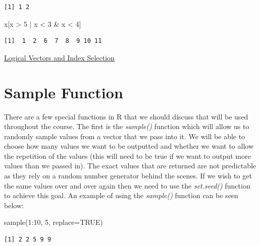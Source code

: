 \documentclass[
  letterpaper,
  DIV=11,
  numbers=noendperiod]{scrreprt}
\newenvironment{Shaded}{\begin{snugshade}}{\end{snugshade}}
\newcommand{\AttributeTok}[1]{\textcolor[rgb]{0.40,0.45,0.13}{#1}}
\newcommand{\ConstantTok}[1]{\textcolor[rgb]{0.56,0.35,0.01}{#1}}
\newcommand{\DecValTok}[1]{\textcolor[rgb]{0.68,0.00,0.00}{#1}}
\newcommand{\FunctionTok}[1]{\textcolor[rgb]{0.28,0.35,0.67}{#1}}
\newcommand{\NormalTok}[1]{\textcolor[rgb]{0.00,0.23,0.31}{#1}}
\newcommand{\SpecialCharTok}[1]{\textcolor[rgb]{0.37,0.37,0.37}{#1}}
\begin{document}
\begin{verbatim}
[1] 1 2
\end{verbatim}

\begin{Shaded}
\begin{Highlighting}[]
\NormalTok{x[x }\SpecialCharTok{\textgreater{}} \DecValTok{5} \SpecialCharTok{|}\NormalTok{ x }\SpecialCharTok{\textless{}} \DecValTok{3} \SpecialCharTok{\&}\NormalTok{ x }\SpecialCharTok{\textless{}} \DecValTok{4}\NormalTok{]}
\end{Highlighting}
\end{Shaded}

\begin{verbatim}
[1]  1  2  6  7  8  9 10 11
\end{verbatim}

\begin{watch}{}{}
    \href{https://youtu.be/QIrSEcEYRVk}{Logical Vectors and Index Selection}
\end{watch}

\section{Sample Function}\label{sample-function}

There are a few special functions in R that we should discuss that will
be used throughout the course. The first is the \emph{sample()} function
which will allow us to randomly sample values from a vector that we pass
into it. We will be able to choose how many values we want to be
outputted and whether we want to allow the repetition of the values
(this will need to be true if we want to output more values than we
passed in). The exact values that are returned are not predictable as
they rely on a random number generator behind the scenes. If we wish to
get the same values over and over again then we need to use the
\emph{set.seed()} function to achieve this goal. An example of using the
\emph{sample()} function can be seen below:

\begin{Shaded}
\begin{Highlighting}[]
\FunctionTok{sample}\NormalTok{(}\DecValTok{1}\SpecialCharTok{:}\DecValTok{10}\NormalTok{, }\DecValTok{5}\NormalTok{, }\AttributeTok{replace=}\ConstantTok{TRUE}\NormalTok{)}
\end{Highlighting}
\end{Shaded}

\begin{verbatim}
[1] 2 2 5 9 9
\end{verbatim}
\end{document}
